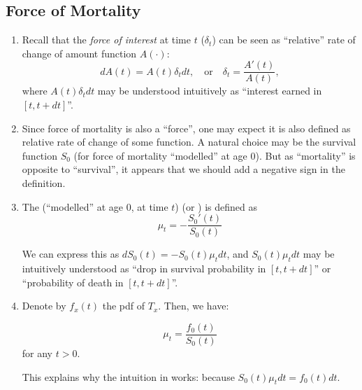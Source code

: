 \subsection{Force of Mortality}
\begin{enumerate}
\item Recall that the \emph{force of interest} at time \(t\) (\(\delta_t\)) can
be seen as ``relative'' rate of change of amount function \(A(\cdot)\):
\[
dA(t)=A(t)\delta_tdt,\quad\text{or}\quad
\delta_t=\frac{A'(t)}{A(t)},
\]
where \(A(t)\delta_tdt\) may be understood intuitively as ``interest earned in
\([t,t+dt]\)''.

\item Since force of mortality is also a ``force'', one may expect it is also
defined as relative rate of change of some function. A natural choice may be
the survival function \(S_0\) (for force of mortality ``modelled'' at age 0).
But as ``mortality'' is opposite to ``survival'', it appears that we should add
a negative sign in the definition.

\item \label{it:fom} The  (``modelled'' at age 0, at
time \(t\))  (or ) is defined as
\[
\mu_t=-\frac{S_0'(t)}{S_0(t)}
\]
\begin{intuition}
We can express this as \(dS_0(t)=-S_0(t)\mu_tdt\), and \(S_0(t)\mu_tdt\) may be
intuitively understood as ``drop in survival probability in \([t,t+dt]\)'' or
``probability of death in \([t,t+dt]\)''.

 \end{intuition}
\item Denote by \(f_x(t)\) the pdf of \(T_x\). Then, we have:
\begin{proposition}
\label{prp:fom-pdf-0}
\[
\mu_t=\frac{f_0(t)}{S_0(t)}
\]
for any \(t>0\).
\end{proposition}

\begin{note}
This explains why the intuition in  works: because
\(S_0(t)\mu_tdt=f_0(t)dt\).
\end{note}


\end{enumerate}
